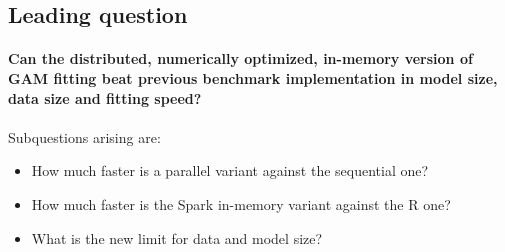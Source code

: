 \documentclass{article}
\begin{document}
    \subsection{Leading question}

    \paragraph{Can the distributed, numerically optimized, in-memory version of GAM fitting beat previous benchmark implementation in model size, data size and fitting speed?}

    \paragraph{}
    Subquestions arising are:
        \begin{itemize}
        \item How much faster is a parallel variant against the sequential one?
        \item How much faster is the Spark in-memory variant against the R one?
        \item What is the new limit for data and model size?
        \end{itemize}
\end{document}
